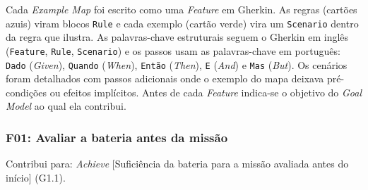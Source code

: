 \documentclass[a4paper, 12pt]{article}
\begin{document}
Cada \textit{Example Map} foi escrito como uma \textit{Feature} em Gherkin. As regras (cartões azuis) viram blocos \texttt{Rule} e cada exemplo (cartão verde) vira um \texttt{Scenario} dentro da regra que ilustra. As palavras-chave estruturais seguem o Gherkin em inglês (\texttt{Feature}, \texttt{Rule}, \texttt{Scenario}) e os passos usam as palavras-chave em português: \texttt{Dado} (\textit{Given}), \texttt{Quando} (\textit{When}), \texttt{Então} (\textit{Then}), \texttt{E} (\textit{And}) e \texttt{Mas} (\textit{But}). Os cenários foram detalhados com passos adicionais onde o exemplo do mapa deixava pré-condições ou efeitos implícitos. Antes de cada \textit{Feature} indica-se o objetivo do \textit{Goal Model} ao qual ela contribui.

\Needspace{8cm}
\subsubsection{F01: Avaliar a bateria antes da missão}

Contribui para: \textit{Achieve} [Suficiência da bateria para a missão avaliada antes do início] (G1.1).
\end{document}
